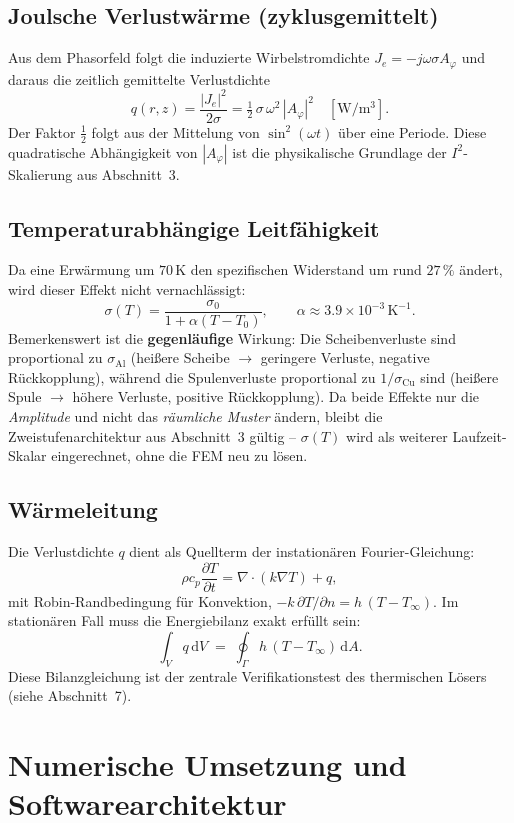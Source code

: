\documentclass[a4paper,11pt]{article}
\begin{document}
\subsection{Joulsche Verlustwärme (zyklusgemittelt)}
Aus dem Phasorfeld folgt die induzierte Wirbelstromdichte
$J_e = -j\omega\sigma A_\varphi$ und daraus die zeitlich gemittelte
Verlustdichte
\[
  q(r,z) = \frac{|J_e|^{2}}{2\sigma}
         = \tfrac{1}{2}\,\sigma\,\omega^{2}\,|A_\varphi|^{2}
         \quad [\mathrm{W/m^3}].
\]
Der Faktor $\tfrac12$ folgt aus der Mittelung von $\sin^2(\omega t)$ über
eine Periode. Diese quadratische Abhängigkeit von $|A_\varphi|$ ist die
physikalische Grundlage der $I^2$-Skalierung aus Abschnitt~3.

\subsection{Temperaturabhängige Leitfähigkeit}
Da eine Erwärmung um $70\,\mathrm{K}$ den spezifischen Widerstand um rund
$27\,\%$ ändert, wird dieser Effekt nicht vernachlässigt:
\[
  \sigma(T) = \frac{\sigma_0}{1+\alpha (T-T_0)}, \qquad
  \alpha \approx 3.9\times 10^{-3}\,\mathrm{K^{-1}}.
\]
Bemerkenswert ist die \textbf{gegenläufige} Wirkung: Die Scheibenverluste
sind proportional zu $\sigma_{\mathrm{Al}}$ (heißere Scheibe $\to$ geringere
Verluste, negative Rückkopplung), während die Spulenverluste proportional
zu $1/\sigma_{\mathrm{Cu}}$ sind (heißere Spule $\to$ höhere Verluste,
positive Rückkopplung). Da beide Effekte nur die \emph{Amplitude} und nicht
das \emph{räumliche Muster} ändern, bleibt die Zweistufenarchitektur aus
Abschnitt~3 gültig -- $\sigma(T)$ wird als weiterer Laufzeit-Skalar
eingerechnet, ohne die FEM neu zu lösen.

\subsection{Wärmeleitung}
Die Verlustdichte $q$ dient als Quellterm der instationären
Fourier-Gleichung:
\[
  \rho c_p \frac{\partial T}{\partial t} = \nabla\!\cdot\!(k\nabla T) + q,
\]
mit Robin-Randbedingung für Konvektion,
$-k\,\partial T/\partial n = h\,(T-T_\infty)$. Im stationären Fall muss die
Energiebilanz exakt erfüllt sein:
\[
  \int_V q\,\mathrm dV \;=\; \oint_{\Gamma} h\,(T-T_\infty)\,\mathrm dA .
\]
Diese Bilanzgleichung ist der zentrale Verifikationstest des thermischen
Lösers (siehe Abschnitt~7).

\section{Numerische Umsetzung und Softwarearchitektur}
\end{document}
